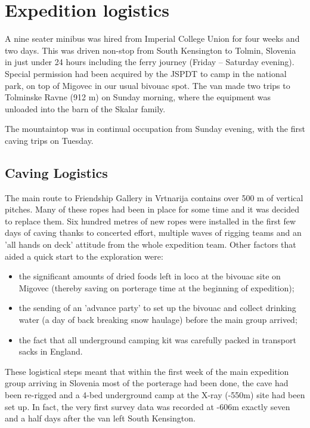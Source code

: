 \documentclass[english,a4]{article}
\begin{document}
\section{Expedition logistics}

A nine seater minibus was hired from Imperial College Union for four weeks and two days. 
This was driven
non-stop from South Kensington to Tolmin, Slovenia in just under 24 hours
including the ferry journey (Friday -- Saturday evening). Special permission
had been acquired by the JSPDT to camp in the national park, on top of Migovec
in our usual bivouac spot. The van made two trips to Tolminske Ravne (912 m) on
Sunday morning, where the equipment was unloaded into the barn of the Skalar
family. 

The mountaintop was in continual occupation from Sunday evening, with the first
caving trips on Tuesday.

\subsection{Caving Logistics}

The main route to Friendship Gallery in Vrtnarija contains over 500
m of vertical pitches. Many of these ropes had been in place 
for some time and it was decided to replace them. Six hundred metres of new
ropes were installed in the first few days of caving thanks to concerted
effort, multiple waves of rigging teams and an 'all hands on deck' attitude
from the whole expedition team.  Other factors that aided a quick start to the
exploration were:
\begin{itemize}
\item the significant amounts of dried foods left in loco at the bivouac
site on Migovec (thereby saving on porterage time at the beginning
of expedition); 
\item the sending of an 'advance party' to set up the bivouac and collect
drinking water (a day of back breaking snow haulage) before the main
group arrived; 
\item the fact that all underground camping kit was carefully packed in
transport sacks in England. 
\end{itemize}
These logistical steps meant that within the first week of the main
expedition group arriving in Slovenia most of the porterage had been
done, the cave had been re-rigged and a 4-bed underground camp at
the X-ray (-550m) site had been set up. In fact, the very first survey
data was recorded at -606m exactly seven and a half days after the
van left South Kensington.
\end{document}
